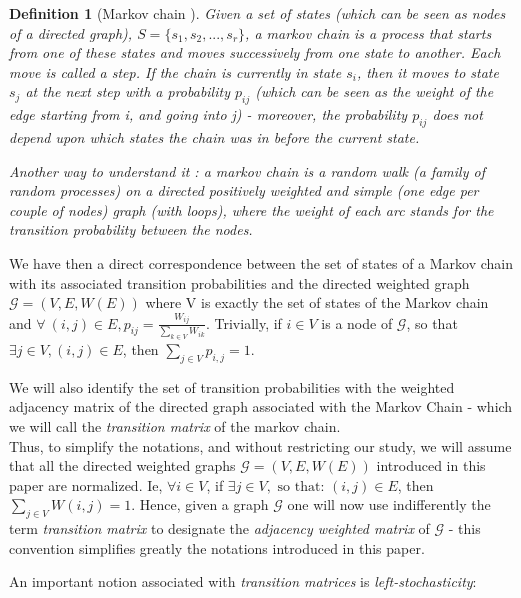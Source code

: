 \documentclass{article}
\newtheorem{definition}{Definition}[section]
\begin{document}
\begin{definition}[Markov chain \cite{grinstead_snell_2006}]

Given a set of \textit{states} (which can be seen as nodes of a directed graph), $S=\{s_1, s_2, ..., s_r\}$, a markov chain is a process that starts from one of these states and moves successively from one state to another. Each move is called a \textit{step}. If the chain is currently in state $s_i$, then it moves to state $s_j$ at the next step with a probability $p_{ij}$ (which can be seen as the weight of the edge starting from i, and going into j) - moreover, the probability $p_{ij}$ does not depend upon which states the chain was in before the current state. 

Another way to understand it : a markov chain is a random walk (a family of random processes) on a directed positively weighted and simple (one edge per couple of nodes) graph (with loops), where the weight of each arc stands for the transition probability between the nodes.

\end{definition}

We have then a direct correspondence between the set of states of a Markov chain with its associated transition probabilities and the directed weighted graph $\mathcal{G}=(V, E, W(E))$ where V is exactly the set of states of the Markov chain and $\forall \ (i,j) \in E, p_{ij} = \frac{W_{ij}}{\sum_{k\in V} W_{ik}}$.
Trivially, if $i \in V$ is a node of $\mathcal{G}$, so that $\exists j \in V, (i,j) \in E$, then $\sum_{j \in V} p_{i,j} = 1$.

We will also identify the set of transition probabilities with the weighted adjacency matrix of the directed graph associated with the Markov Chain - which we will call the \textit{transition matrix} of the markov chain. \\
Thus, to simplify the notations, and without restricting our study, we will assume that all the directed weighted graphs $\mathcal{G}=(V, E, W(E))$ introduced in this paper are normalized. Ie, $\forall i \in V$, if $\exists j \in V, \mbox{ so that: } (i,j)\in E$, then $\sum_{j \in V} W(i,j) = 1$. Hence, given a graph $\mathcal{G}$ one will now use indifferently the term \textit{transition matrix} to designate the \textit{adjacency weighted matrix} of $\mathcal{G}$ - this convention simplifies greatly the notations introduced in this paper.

An important notion associated with \textit{transition matrices} is \textit{left-stochasticity}:
\end{document}
